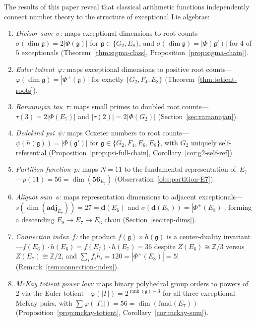 \documentclass[11pt]{amsart}
\theoremstyle{plain}
\theoremstyle{definition}
\theoremstyle{remark}
\newcommand{\fg}{\mathfrak{g}}
\renewcommand{\Phi}{\varPhi}
\newcommand{\rank}{\operatorname{rank}}
\begin{document}
The results of this paper reveal that classical arithmetic
functions independently connect number theory to the structure of
exceptional Lie algebras:
\begin{enumerate}
  \item \emph{Divisor sum~$\sigma$:} maps exceptional dimensions to
    root counts---$\sigma(\dim\fg) = 2|\Phi(\fg)|$ for
    $\fg \in \{G_2, E_8\}$, and $\sigma(\dim\fg) = |\Phi(\fg')|$
    for $4$ of $5$ exceptionals
    (Theorem~\ref{thm:sigma-class},
    Proposition~\ref{prop:sigma-chain}).
  \item \emph{Euler totient~$\varphi$:} maps exceptional dimensions to
    positive root counts---$\varphi(\dim\fg) = |\Phi^+(\fg)|$ for
    exactly $\{G_2, F_4, E_8\}$
    (Theorem~\ref{thm:totient-roots}).
  \item \emph{Ramanujan tau~$\tau$:} maps small primes to doubled
    root counts---$\tau(3) = 2|\Phi(E_7)|$ and
    $|\tau(2)| = 2|\Phi(G_2)|$
    (Section~\ref{sec:ramanujan}).
  \item \emph{Dedekind psi~$\psi$:} maps Coxeter numbers to
    root counts---$\psi(h(\fg)) = |\Phi(\fg')|$ for
    $\fg \in \{G_2, F_4, E_6, E_8\}$, with $G_2$ uniquely
    self-referential
    (Proposition~\ref{prop:psi-full-chain},
    Corollary~\ref{cor:g2-self-ref}).
  \item \emph{Partition function~$p$:} maps
    $N = 11$ to the fundamental representation of~$E_7$---$p(11) = 56 = \dim(\mathbf{56}_{E_7})$
    (Observation~\ref{obs:partition-E7}).
  \item \emph{Aliquot sum~$s$:} maps representation dimensions to
    adjacent exceptionals---$s(\dim(\mathbf{adj}_{E_7})) = 27 = \mathbf{d}(E_6)$
    and $\sigma(\mathbf{d}(E_7)) = |\Phi^+(E_8)|$, forming a descending
    $E_8 \to E_7 \to E_6$ chain
    (Section~\ref{sec:rep-dims}).
  \item \emph{Connection index~$f$:} the product $f(\fg) \times h(\fg)$
    is a center-duality invariant---$f(E_6) \cdot h(E_6) = f(E_7) \cdot h(E_7) = 36$
    despite $Z(E_6) \cong \mathbb{Z}/3$ versus $Z(E_7) \cong \mathbb{Z}/2$,
    and $\sum_{i} f_i h_i = 120 = |\Phi^+(E_8)| = 5!$
    (Remark~\ref{rem:connection-index}).
  \item \emph{McKay totient power law:} maps binary polyhedral group
    orders to powers of~$2$ via the Euler totient---$\varphi(|\Gamma|)
    = 2^{\rank(\fg)-3}$ for all three exceptional McKay pairs, with
    $\sum\varphi(|\Gamma_i|) = 56 = \dim(\mathrm{fund}(E_7))$
    (Proposition~\ref{prop:mckay-totient},
    Corollary~\ref{cor:mckay-sum}).

\end{enumerate}
\end{document}
